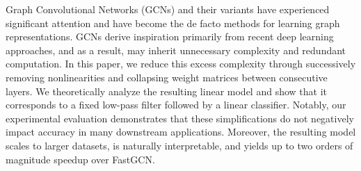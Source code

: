 Graph Convolutional Networks (GCNs) and their variants have experienced significant attention and have become the de facto methods for learning graph representations. 
GCNs derive inspiration primarily from recent deep learning approaches, and as a result, may inherit unnecessary complexity and redundant computation. 
In this paper, we reduce this excess complexity through successively removing nonlinearities and collapsing weight matrices between consecutive layers. 
We theoretically analyze the resulting linear model and show that it corresponds to a fixed low-pass filter followed by a linear classifier. 
Notably, our experimental evaluation demonstrates that these simplifications do not negatively impact accuracy in many downstream applications.
Moreover, the resulting model scales to larger datasets, is naturally interpretable, and yields up to two orders of magnitude speedup over FastGCN. 


